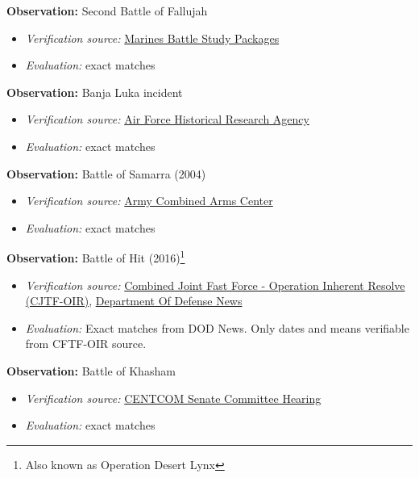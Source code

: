 \documentclass[fleqn,12pt]{article}
\begin{document}
\vspace{-.3cm}
\noindent
\textbf{Observation:} Second Battle of Fallujah
\begin{itemize}
    \item \textit{Verification source:} \href{https://www.usmcu.edu/Portals/218/FALLUJAH.pdf}{Marines Battle Study Packages}
    \item \textit{Evaluation:} exact matches
\end{itemize}

\vspace{-.3cm}
\noindent
\textbf{Observation:} Banja Luka incident
\begin{itemize}
    \item \textit{Verification source:} \href{https://www.afhra.af.mil/Portals/16/documents/Airmen-at-War/Haulman-MannedAircraftLossesYugoslavia1994-1999.pdf?ver=2016-08-22-131404-383}{Air Force Historical Research Agency}
    \item \textit{Evaluation:} exact matches
\end{itemize}

\vspace{-.3cm}
\noindent
\textbf{Observation:} Battle of Samarra (2004)
\begin{itemize}
    \item \textit{Verification source:} \href{https://www.armyupress.army.mil/Portals/7/combat-studies-institute/csi-books/BetweenTheRivers_McGrath.pdf}{Army Combined Arms Center}
    \item \textit{Evaluation:} exact matches
\end{itemize}

\vspace{-.3cm}
\noindent
\textbf{Observation:} Battle of Hit (2016)\footnote{Also known as Operation Desert Lynx}
\begin{itemize}
    \item \textit{Verification source:} \href{https://www.inherentresolve.mil/NEWSROOM/Article/776143/oir-spokesman-attacks-in-baghdad-show-isil-reverting-to-terrorist-roots/}{Combined Joint Fast Force - Operation Inherent Resolve (CJTF-OIR)}, \href{https://media.defense.gov/2016/Jun/07/2001550104/-1/-1/0/160515-O-ZZ999-001.JPG}{Department Of Defense News}
    \item \textit{Evaluation:} Exact matches from DOD News. Only dates and means verifiable from CFTF-OIR source.
\end{itemize}

\noindent
\textbf{Observation:} Battle of Khasham
\begin{itemize}
    \item \textit{Verification source:} \href{https://www.armed-services.senate.gov/imo/media/doc/22-12_03-15-2022.pdf}{CENTCOM Senate Committee Hearing}
    \item \textit{Evaluation:} exact matches
\end{itemize}
\end{document}
